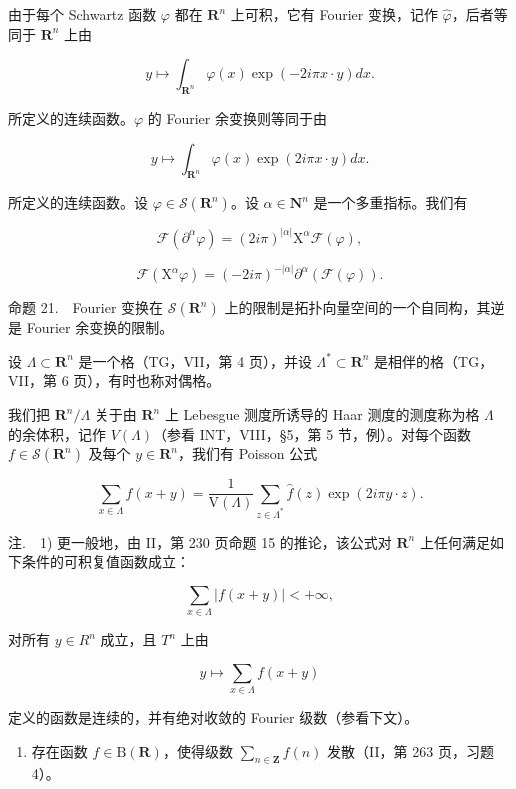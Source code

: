 由于每个 Schwartz 函数 \(\varphi\) 都在 \(\mathbf{R}^n\) 上可积，它有 Fourier 变换，记作 \(\widehat{\varphi}\)，后者等同于 \(\mathbf{R}^n\) 上由

\[
y \mapsto \int_ {\mathbf {R} ^ {n}} \varphi (x) \exp (- 2 i \pi x \cdot y) d x.
\]

所定义的连续函数。\(\varphi\) 的 Fourier 余变换则等同于由

\[
y \mapsto \int_ {\mathbf {R} ^ {n}} \varphi (x) \exp (2 i \pi x \cdot y) d x.
\]

所定义的连续函数。设 \(\varphi\in\mathcal{S}(\mathbf{R}^{n})\)。设 \(\alpha\in\mathbf{N}^{n}\) 是一个多重指标。我们有

\[
\mathcal {F} (\partial^ {\alpha} \varphi) = (2 i \pi) ^ {| \alpha |} \mathrm{X} ^ {\alpha} \mathcal {F} (\varphi),
\]

\[
\mathcal {F} (\mathrm{X} ^ {\alpha} \varphi) = (- 2 i \pi) ^ {- | \alpha |} \partial^ {\alpha} (\mathcal {F} (\varphi)).
\]

命题 21.　Fourier 变换在 \(\mathcal{S}(\mathbf{R}^{n})\) 上的限制是拓扑向量空间的一个自同构，其逆是 Fourier 余变换的限制。

设 \(\Lambda \subset \mathbf{R}^n\) 是一个格（TG，VII，第 4 页），并设 \(\Lambda^{*} \subset \mathbf{R}^{n}\) 是相伴的格（TG，VII，第 6 页），有时也称对偶格。

我们把 \(\mathbf{R}^n/\Lambda\) 关于由 \(\mathbf{R}^n\) 上 Lebesgue 测度所诱导的 Haar 测度的测度称为格 \(\Lambda\) 的余体积，记作 \(V(\Lambda)\)（参看 INT，VIII，§5，第 5 节，例）。对每个函数 \(f \in \mathcal{S}(\mathbf{R}^n)\) 及每个 \(y \in \mathbf{R}^n\)，我们有 Poisson 公式

\[
\sum_ {x \in \Lambda} f (x + y) = \frac {1}{\mathrm{V} (\Lambda)} \sum_ {z \in \Lambda^ {*}} \widehat {f} (z) \exp (2 i \pi y \cdot z).
\]

注.　1) 更一般地，由 II，第 230 页命题 15 的推论，该公式对 \(\mathbf{R}^n\) 上任何满足如下条件的可积复值函数成立：

\[
\sum_ {x \in \Lambda} | f (x + y) | <   + \infty ,
\]

对所有 \(y \in R^{n}\) 成立，且 \(T^{n}\) 上由

\[
y \mapsto \sum_ {x \in \Lambda} f (x + y)
\]

定义的函数是连续的，并有绝对收敛的 Fourier 级数（参看下文）。

\begin{enumerate}
\def\labelenumi{\arabic{enumi})}
\setcounter{enumi}{1}
\tightlist
\item
  存在函数 \(f \in \mathrm{B}(\mathbf{R})\)，使得级数 \(\sum_{n \in \mathbf{Z}} f(n)\) 发散（II，第 263 页，习题 4）。
\end{enumerate}

